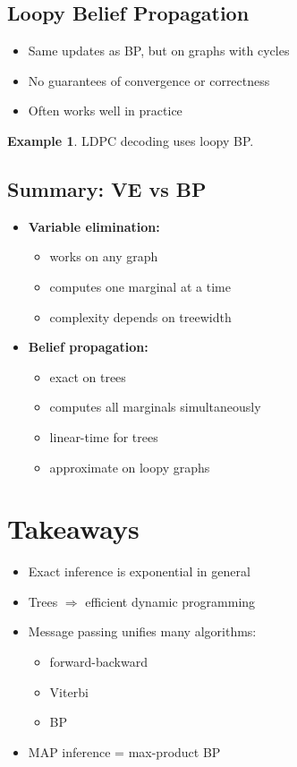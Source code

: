 \documentclass[12pt,oneside]{book}
\numberwithin{equation}{section}
\theoremstyle{definition}
\newtheorem{example}{Example}[section]
\theoremstyle{plain}
\theoremstyle{remark}
\begin{document}
\subsection{Loopy Belief Propagation}

\begin{itemize}
\item Same updates as BP, but on graphs with cycles
\item No guarantees of convergence or correctness
\item Often works well in practice
\end{itemize}

\begin{example}
LDPC decoding uses loopy BP.
\end{example}


\subsection*{Summary: VE vs BP}

\begin{itemize}
\item \textbf{Variable elimination:}
\begin{itemize}
\item works on any graph
\item computes one marginal at a time
\item complexity depends on treewidth
\end{itemize}

\item \textbf{Belief propagation:}
\begin{itemize}
\item exact on trees
\item computes all marginals simultaneously
\item linear-time for trees
\item approximate on loopy graphs
\end{itemize}
\end{itemize}


\section{Takeaways}

\begin{itemize}
\item Exact inference is exponential in general
\item Trees $\Rightarrow$ efficient dynamic programming
\item Message passing unifies many algorithms:
\begin{itemize}
\item forward-backward
\item Viterbi
\item BP
\end{itemize}
\item MAP inference = max-product BP
\end{itemize}
\end{document}
